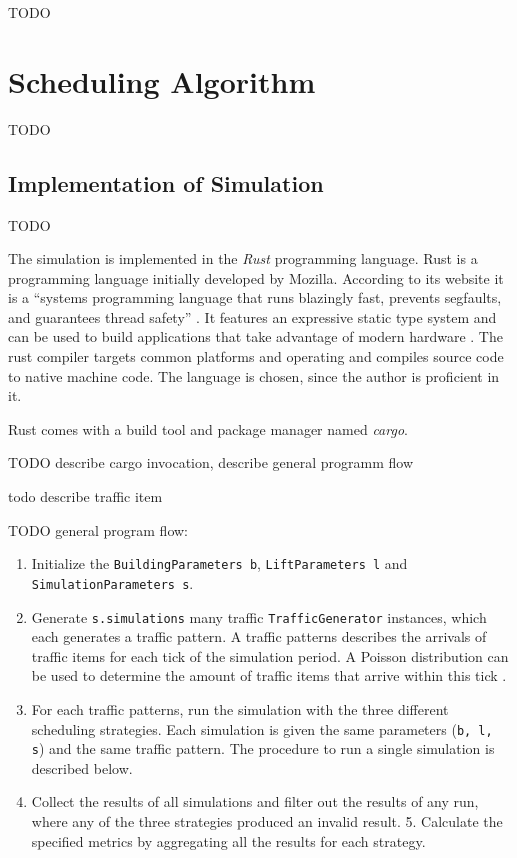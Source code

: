 TODO

\section{Scheduling Algorithm}
TODO
\subsection{Implementation of Simulation}

TODO

The simulation is implemented in the \emph{Rust} programming language.
Rust is a programming language initially developed by Mozilla.
According to its website it is a \enquote{systems programming language that runs blazingly fast, prevents segfaults, and guarantees thread safety} \autocite{rust2018rust}.
It features an expressive static type system and can be used to build applications that take advantage of modern hardware
\autocite[][]{matsakis2014rust}.
The rust compiler targets common platforms and operating and compiles source code to native machine code.
The language is chosen, since the author is proficient in it.

Rust comes with a build tool and package manager named \emph{cargo}. 

TODO describe cargo invocation, describe general programm flow

todo describe traffic item

TODO
general program flow:


\begin{enumerate}
    \item Initialize the \texttt{BuildingParameters b}, \texttt{LiftParameters l} and\\ \texttt{SimulationParameters s}.
    \item Generate \texttt{s.simulations} many traffic \texttt{TrafficGenerator} instances, which each generates a traffic pattern. A traffic patterns describes the arrivals of traffic items for each tick of the simulation period. A Poisson distribution can be used to determine the amount of traffic items that arrive within this tick \autocite{beers2015arrivals}.
    \item For each traffic patterns, run the simulation with the three different scheduling strategies. Each simulation is given the same parameters (\texttt{b, l, s}) and the same traffic pattern. The procedure to run a single simulation is described below.
    \item Collect the results of all simulations and filter out the results of any run, where any of the three strategies produced an invalid result.
    5. Calculate the specified metrics by aggregating all the results for each strategy.
\end{enumerate}

